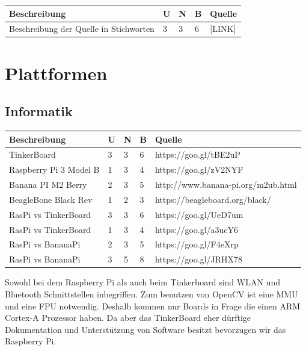\documentclass[a4paper]{report}
\begin{document}
\vspace{1em}
\noindent
\begin{tabular}{|p{}|p{}|p{}|p{}|p{}|}
	\hline
	\textbf{Beschreibung} & \textbf{U} & \textbf{N} & \textbf{B} & \textbf{Quelle} \\
	\hline
	Beschreibung der Quelle in Stichworten & 3 & 3 & 6 & [LINK]\\
	\hline
\end{tabular}

\section{Plattformen}
\label{app:sec:Plattformen}
\subsection{Informatik}
\label{app:ssec:Inf}
\vspace{1em}
\noindent
\begin{tabular}{|p{}|p{}|p{}|p{}|p{}|}
	\hline
	\textbf{Beschreibung} & \textbf{U} & \textbf{N} & \textbf{B} & \textbf{Quelle} \\
	\hline
	TinkerBoard & 3 & 3 & 6 & https://goo.gl/tBE2uP\\
	\hline
	Raspberry Pi 3 Model B & 1 & 3 & 4 & https://goo.gl/zV2NYF \\
	\hline
	Banana PI M2 Berry & 2 & 3 & 5 & http://www.banana-pi.org/m2ub.html \\
	\hline
	BeagleBone Black Rev & 1 & 2 & 3 & https://beagleboard.org/black/\\
	\hline
	RasPi vs TinkerBoard & 3 & 3 & 6 & https://goo.gl/UeD7um\\
	\hline
	RasPi vs TinkerBoard & 1 & 3 & 4 & https://goo.gl/a3ucY6\\
	\hline
	RasPi vs BananaPi & 2 & 3 & 5 & https://goo.gl/F4eXrp\\
	\hline
	RasPi vs BananaPi & 3 & 5 & 8 & https://goo.gl/JRHX78\\
	\hline
\end{tabular}

\vspace{1em}
Sowohl bei dem Raspberry Pi als auch beim Tinkerboard sind WLAN und Bluetooth
Schnittstellen inbegriffen. Zum benutzen von OpenCV ist eine MMU und eine FPU
notwendig. Deshalb kommen nur Boards in Frage die einen ARM Cortex-A Prozessor
haben. Da aber das TinkerBoard eher dürftige Dokumentation und Unterstützung von Software besitzt \parencite[Fazit]{Finnamore2017} bevorzugen wir das Raspberry Pi.
\end{document}
